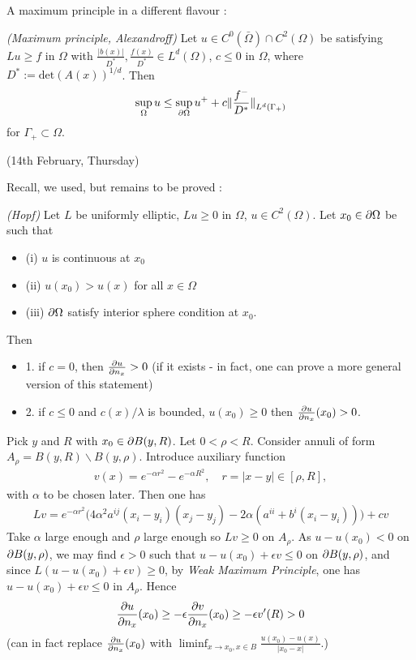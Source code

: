 \documentclass[12pt,a4paper]{article}
\newenvironment{proof}
{\begin{changemargin}{0.5cm}{0.5cm} 
	}%
	{\end{changemargin}
}
\renewenvironment{i}
{\begin{itemize} 
	}%
	{\end{itemize}
}
\newenvironment{p}
{\begin{proof} 
	}%
	{\end{proof}
}
\begin{document}
A maximum principle in a different flavour :
\s

\thm \emph{(Maximum principle, Alexandroff)} Let $u \in C^0(\bar{\Omega}) \cap C^2(\Omega)$ be satisfying $Lu \geq f$ in $\Omega$ with $\frac{|b(x)|}{D^*}, \frac{f(x)}{D^*} \in L^d(\Omega)$, $c\leq  0$ in $\Omega$, where $D^* := \text{det}(A(x))^{1/d}$. Then
\begin{align*}
\sup_{\Omega} u \leq \sup_{\pa \Omega} u^+  + c \snorms{\frac{f^-}{D^*}}{L^d(\Gamma_+)}
\end{align*}
for $\Gamma_+ \subset \Omega$.
\s

\newday

(14th February, Thursday)
\s

Recall, we used, but remains to be proved :

\lem \emph{(Hopf)} Let $L$ be uniformly elliptic, $Lu \geq 0$ in $\Omega$, $u\in C^2(\Omega)$. Let $x_0 \in \partial \Omega$ be such that
\begin{i}
\item[(i)] $u$ is continuous at $x_0$
\item[(ii)] $u(x_0) > u(x)$ for all $x\in \Omega$
\item[(iii)] $\partial \Omega$ satisfy interior sphere condition at $x_0$. 
\end{i}
Then
\begin{i}
\item[1.] if $c=0$, then $\frac{\partial u}{\partial n_x} >0$ (if it exists - in fact, one can prove a more general version of this statement)
\item[2.] if $c\leq 0$ and $c(x)/\lambda$ is bounded, $u(x_0)\geq 0$ then $\frac{\partial u}{\partial n_x}(x_0)>0$.
\end{i}
\begin{p}
\pf Pick $y$ and $R$ with $x_0 \in \partial B(y, R)$. Let $0< \rho < R$. Consider annuli of form $A_{\rho} = B(y, R) \backslash B(y, \rho)$. Introduce auxiliary function
\begin{align*}
v(x) = e^{-\alpha r^2} - e^{-\alpha R^2}, \quad r=|x-y|\in [\rho, R],
\end{align*}
with $\alpha$ to be chosen later. Then one has
\begin{align*}
Lv = e^{-\alpha r^2} \Big( 4\alpha^2 a^{ij}(x_i -y_i)(x_j -y_j) - 2\alpha (a^{ii} + b^i (x_i - y_i)) \Big) + cv
\end{align*}
Take $\alpha$ large enough and $\rho$ large enough so $Lv \geq 0$ on $A_{\rho}$. As $u - u(x_0) < 0$ on $\partial B(y, \rho)$, we may find $\epsilon >0$ such that $u - u(x_0) + \epsilon v \leq 0$ on $\partial B(y, \rho)$, and since $L(u-u(x_0)+ \epsilon v) \geq 0$, by \emph{Weak Maximum Principle}, one has $u - u(x_0) + \epsilon v\leq 0$ in $A_{\rho}$. Hence
\begin{align*}
\frac{\partial u}{\partial n_x}(x_0)\geq - \epsilon \frac{\partial v}{\partial n_x}(x_0) \geq - \epsilon v'(R) > 0
\end{align*}
(can in fact replace $\frac{\partial u}{\partial n_x}(x_0)$ with $\liminf_{x\rightarrow x_0, x\in B}\frac{u(x_0)- u(x)}{|x_0 - x|}$.)

\eop
\end{p}
\s
\end{document}
